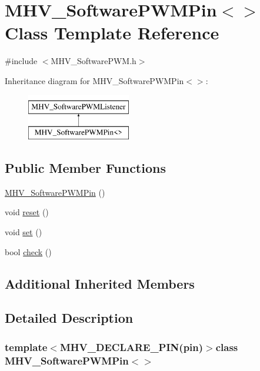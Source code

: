 \hypertarget{class_m_h_v___software_p_w_m_pin}{\section{M\-H\-V\-\_\-\-Software\-P\-W\-M\-Pin$<$$>$ Class Template Reference}
\label{class_m_h_v___software_p_w_m_pin}
}


{\ttfamily \#include $<$M\-H\-V\-\_\-\-Software\-P\-W\-M.\-h$>$}

Inheritance diagram for M\-H\-V\-\_\-\-Software\-P\-W\-M\-Pin$<$$>$\-:\begin{figure}[H]
\begin{center}
\leavevmode
\includegraphics[height=2.000000cm]{class_m_h_v___software_p_w_m_pin}
\end{center}
\end{figure}
\subsection*{Public Member Functions}
\begin{DoxyCompactItemize}
\item 
\hyperlink{class_m_h_v___software_p_w_m_pin_a939edcff3e640598b4e41756135ae83d}{M\-H\-V\-\_\-\-Software\-P\-W\-M\-Pin} ()
\item 
void \hyperlink{class_m_h_v___software_p_w_m_pin_a57733b6d872cfd1fe63a30766601eb87}{reset} ()
\item 
void \hyperlink{class_m_h_v___software_p_w_m_pin_aace178b9ef1123317c67f35f9b8ee7e8}{set} ()
\item 
bool \hyperlink{class_m_h_v___software_p_w_m_pin_ac7538132834fb5fca1a04b213cc431c8}{check} ()
\end{DoxyCompactItemize}
\subsection*{Additional Inherited Members}


\subsection{Detailed Description}
\subsubsection*{template$<$M\-H\-V\-\_\-\-D\-E\-C\-L\-A\-R\-E\-\_\-\-P\-I\-N(pin)$>$class M\-H\-V\-\_\-\-Software\-P\-W\-M\-Pin$<$$>$}




